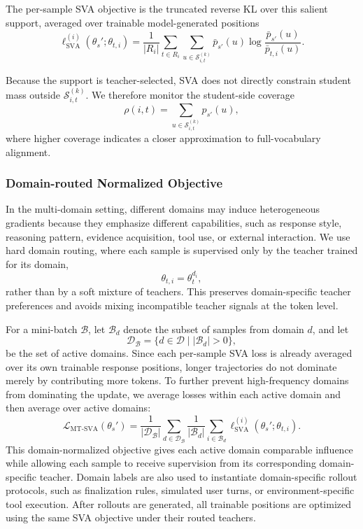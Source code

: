 The per-sample SVA objective is the truncated reverse KL over this salient support, averaged over trainable model-generated positions
\begin{equation}
\ell_{\mathrm{SVA}}^{(i)}(\theta_s';\theta_{t,i})
=
\frac{1}{|R_i|}
\sum_{t\in R_i}
\sum_{u\in \mathcal{S}_{i,t}^{(k)}}
\bar p_{s'}(u)
\log
\frac{\bar p_{s'}(u)}{\bar p_{t,i}(u)} .
\end{equation}

Because the support is teacher-selected, SVA does not directly constrain student mass outside $\mathcal{S}_{i,t}^{(k)}$. We therefore monitor the student-side coverage
\begin{equation}
\rho(i,t)
=
\sum_{u\in \mathcal{S}_{i,t}^{(k)}} p_{s'}(u),
\end{equation}
where higher coverage indicates a closer approximation to full-vocabulary alignment.


\subsubsection{Domain-routed Normalized Objective}

In the multi-domain setting, different domains may induce heterogeneous gradients because they emphasize different capabilities, such as response style, reasoning pattern, evidence acquisition, tool use, or external interaction. We use hard domain routing, where each sample is supervised only by the teacher trained for its domain,
\[
\theta_{t,i} = \theta_t^{d_i},
\]
rather than by a soft mixture of teachers. This preserves domain-specific teacher preferences and avoids mixing incompatible teacher signals at the token level.

For a mini-batch $\mathcal{B}$, let $\mathcal{B}_d$ denote the subset of samples from domain $d$, and let
\[
\mathcal{D}_{\mathcal{B}}
=
\{d\in\mathcal{D}\mid |\mathcal{B}_d|>0\},
\]
be the set of active domains. Since each per-sample SVA loss is already averaged over its own trainable response positions, longer trajectories do not dominate merely by contributing more tokens. To further prevent high-frequency domains from dominating the update, we average losses within each active domain and then average over active domains:
\begin{equation}
\mathcal{L}_{\mathrm{MT\text{-}SVA}}(\theta_s')
=
\frac{1}{|\mathcal{D}_{\mathcal{B}}|}
\sum_{d\in \mathcal{D}_{\mathcal{B}}}
\frac{1}{|\mathcal{B}_d|}
\sum_{i\in \mathcal{B}_d}
\ell_{\mathrm{SVA}}^{(i)}(\theta_s';\theta_{t,i}).
\end{equation}
This domain-normalized objective gives each active domain comparable influence while allowing each sample to receive supervision from its corresponding domain-specific teacher. Domain labels are also used to instantiate domain-specific rollout protocols, such as finalization rules, simulated user turns, or environment-specific tool execution. After rollouts are generated, all trainable positions are optimized using the same SVA objective under their routed teachers.
